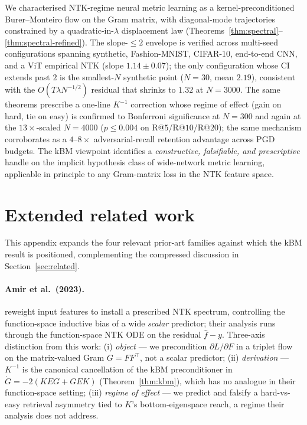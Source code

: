\documentclass{article}
\begin{document}
We characterised NTK-regime neural metric learning as a
kernel-preconditioned Burer--Monteiro flow on the Gram matrix, with
diagonal-mode trajectories constrained by a quadratic-in-$\lambda$
displacement law (Theorems~\ref{thm:spectral}--\ref{thm:spectral-refined}).
The slope-$\leq 2$ envelope is verified across multi-seed configurations
spanning synthetic, Fashion-MNIST, CIFAR-10, end-to-end CNN, and a ViT
empirical NTK (slope $1.14 \pm 0.07$); the only configuration whose CI
extends past $2$ is the smallest-$N$ synthetic point ($N{=}30$, mean
$2.19$), consistent with the $O(T\lambda N^{-1/2})$ residual that
shrinks to $1.32$ at $N{=}3000$. The same
theorems prescribe a one-line $K^{-1}$ correction whose regime of
effect (gain on hard, tie on easy) is confirmed to Bonferroni
significance at $N{=}300$ and again at the $13\times$-scaled
$N{=}4000$ ($p\!\leq\!0.004$ on R@$5$/R@$10$/R@$20$); the same
mechanism corroborates as a $4$--$8\times$ adversarial-recall
retention advantage across PGD budgets. The kBM viewpoint identifies
a \emph{constructive, falsifiable, and prescriptive} handle on the
implicit hypothesis class of wide-network metric learning, applicable
in principle to any Gram-matrix loss in the NTK feature space.




\appendix

\section{Extended related work}
\label{app:extended-related}

This appendix expands the four relevant prior-art families against
which the kBM result is positioned, complementing the compressed
discussion in Section~\ref{sec:related}.

\paragraph{Amir et al.\ (2023).} \citet{amir2023controlling} reweight
input features to install a prescribed NTK spectrum, controlling the
function-space inductive bias of a wide \emph{scalar} predictor; their
analysis runs through the function-space NTK ODE on the residual
$\hat f - y$. Three-axis distinction from this work: (i) \emph{object}
--- we precondition $\partial L/\partial F$ in a triplet flow on the
matrix-valued Gram $G = FF^\top$, not a scalar predictor; (ii)
\emph{derivation} --- $K^{-1}$ is the canonical cancellation of the
kBM preconditioner in $\dot G = -2(KEG + GEK)$
(Theorem~\ref{thm:kbm}), which has no analogue in their function-space
setting; (iii) \emph{regime of effect} --- we predict and falsify a
hard-vs-easy retrieval asymmetry tied to $K$'s bottom-eigenspace
reach, a regime their analysis does not address.
\end{document}

